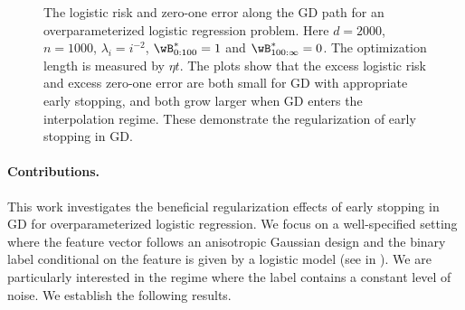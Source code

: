 \documentclass[11pt]{article}
\begin{document}
\begin{figure*}[t]
    \centering
    \hfill
    \caption{The logistic risk and zero-one error along the GD path for an overparameterized logistic regression problem. 
    Here $d=2000$, $n=1000$, $\lambda_i=i^{-2}$, $\wB^*_{0:100}=1$ and $\wB^*_{100:\infty}=0$. The optimization length is measured by $\eta t$. The plots show that the excess logistic risk and excess zero-one error are both small for GD with appropriate early stopping, and both grow larger when GD enters the interpolation regime. These demonstrate the regularization of early stopping in GD. }
    \label{fig:toy}
\end{figure*}

\paragraph{Contributions.} 
This work investigates the beneficial regularization effects of early stopping in GD for overparameterized logistic regression. We focus on a well-specified setting where the feature vector follows an anisotropic Gaussian design and the binary label conditional on the feature is given by a logistic model (see  in ). 
We are particularly interested in the regime where the label contains a constant level of noise. 
We establish the following results.
\end{document}

